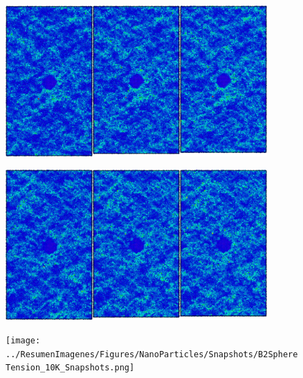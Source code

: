 \begin{figure}[htp]
\centering
\includegraphics[width=10cm]{../ResumenImagenes/Figures/NanoParticles/Snapshots/cuSphereCompression_200K_Snapshots.png}
\caption[Inclusión de Cu-FCC bajo compresión a 200K]{}
\label{C4:fg:snapshot_comp_FCC_200K}
\end{figure}

\begin{figure}[htp]
\centering
\includegraphics[width=10cm]{../ResumenImagenes/Figures/NanoParticles/Snapshots/cuSphereCompression_300K_Snapshots.png}
\caption[Inclusión de Cu-FCC bajo compresión a 300K]{}
\label{C4:fg:snapshot_comp_FCC_300K}
\end{figure}

\begin{figure}[htp]
\centering
\texttt{[image: ../ResumenImagenes/Figures/NanoParticles/Snapshots/B2SphereTension\_10K\_Snapshots.png]}
\caption[Inclusión de CuZr-B2 bajo tracción a 10K]{}
\label{C4:fg:snapshot_ten_B2_10K}
\end{figure}

